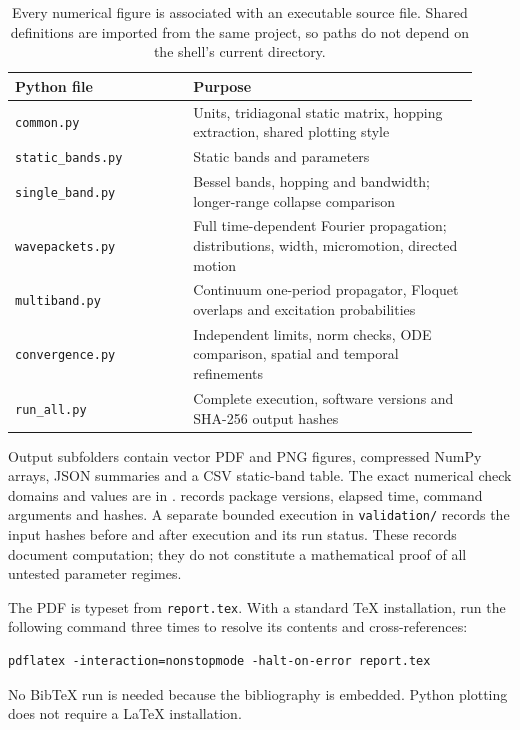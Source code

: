 \documentclass[11pt,oneside]{report}
\numberwithin{equation}{chapter}
\begin{document}
\begin{table}[!htbp]\centering\small
\begin{tabular}{P{0.35\linewidth}P{0.57\linewidth}}\toprule
Python file&Purpose\\\midrule
\texttt{common.py}&Units, tridiagonal static matrix, hopping extraction, shared plotting style\\
\texttt{static\_bands.py}&Static bands and parameters\\
\texttt{single\_band.py}&Bessel bands, hopping and bandwidth; longer-range collapse comparison\\
\texttt{wavepackets.py}&Full time-dependent Fourier propagation; distributions, width, micromotion, directed motion\\
\texttt{multiband.py}&Continuum one-period propagator, Floquet overlaps and excitation probabilities\\
\texttt{convergence.py}&Independent limits, norm checks, ODE comparison, spatial and temporal refinements\\
\texttt{run\_all.py}&Complete execution, software versions and SHA-256 output hashes\\\bottomrule
\end{tabular}\caption{Every numerical figure is associated with an executable source file. Shared definitions are imported from the same project, so paths do not depend on the shell's current directory.}\end{table}

Output subfolders contain vector PDF and PNG figures, compressed NumPy arrays, JSON summaries and a CSV static-band table. The exact numerical check domains and values are in .  records package versions, elapsed time, command arguments and hashes. A separate bounded execution in \texttt{validation/} records the input hashes before and after execution and its run status. These records document computation; they do not constitute a mathematical proof of all untested parameter regimes.

The PDF is typeset from \texttt{report.tex}. With a standard TeX installation, run the following command three times to resolve its contents and cross-references:
\begin{lstlisting}
pdflatex -interaction=nonstopmode -halt-on-error report.tex
\end{lstlisting}
No BibTeX run is needed because the bibliography is embedded. Python plotting does not require a LaTeX installation.
\end{document}
